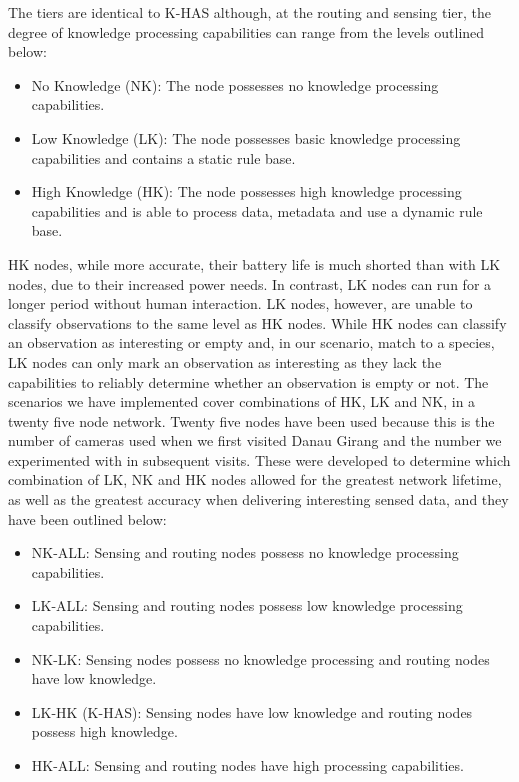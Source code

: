 	The tiers are identical to K-HAS although, at the routing and sensing tier, the degree of knowledge processing capabilities can range from the levels outlined below:
	
	\begin{itemize}
		\item No Knowledge (NK): The node possesses no knowledge processing capabilities.
		\item Low Knowledge (LK): The node possesses basic knowledge processing capabilities and contains a static rule base.
		\item High Knowledge (HK): The node possesses high knowledge processing capabilities and is able to process data, metadata and use a dynamic rule base.
	\end{itemize}
	
	HK nodes, while more accurate, their battery life is much shorted than with LK nodes, due to their increased power needs. In contrast, LK nodes can run for a longer period without human interaction. LK nodes, however, are unable to classify observations to the same level as HK nodes. While HK nodes can classify an observation as interesting or empty and, in our scenario, match to a species, LK nodes can only mark an observation as interesting as they lack the capabilities to reliably determine whether an observation is empty or not. The scenarios we have implemented cover combinations of HK, LK and NK, in a twenty five node network. Twenty five nodes have been used because this is the number of cameras used when we first visited Danau Girang and the number we experimented with in subsequent visits. These were developed to determine which combination of LK, NK and HK nodes allowed for the greatest network lifetime, as well as the greatest accuracy when delivering interesting sensed data, and they have been outlined below:
	
	\begin{itemize}
		\item NK-ALL: Sensing and routing nodes possess no knowledge processing capabilities.
		\item LK-ALL: Sensing and routing nodes possess low knowledge processing capabilities.
		\item NK-LK: Sensing nodes possess no knowledge processing and routing nodes have low knowledge.
		\item LK-HK (K-HAS): Sensing nodes have low knowledge and routing nodes possess high knowledge.
		\item HK-ALL: Sensing and routing nodes have high processing capabilities.
	\end{itemize}

